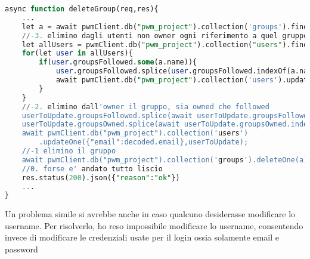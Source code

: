 \begin{lstlisting}[language=SQL]
async function deleteGroup(req,res){
    ...
    let a = await pwmClient.db("pwm_project").collection('groups').findOne({"name": validator.escape(req.params.name)})
    //-3. elimino dagli utenti non owner ogni riferimento a quel gruppo
    let allUsers = pwmClient.db("pwm_project").collection("users").find({"email":{$not: decoded.email}})
    for(let user in allUsers){
        if(user.groupsFollowed.some(a.name)){
            user.groupsFollowed.splice(user.groupsFollowed.indexOf(a.name),1)
            await pwmClient.db("pwm_project").collection('users').updateOne({"email":user.email},user)
        }
    }
    //-2. elimino dall'owner il gruppo, sia owned che followed
    userToUpdate.groupsFollowed.splice(await userToUpdate.groupsFollowed.indexOf(a.name),1)
    userToUpdate.groupsOwned.splice(await userToUpdate.groupsOwned.indexOf(a.name),1)
    await pwmClient.db("pwm_project").collection('users')
        .updateOne({"email":decoded.email},userToUpdate);
    //-1 elimino il gruppo
    await pwmClient.db("pwm_project").collection('groups').deleteOne(a)
    //0. forse e' andato tutto liscio
    res.status(200).json({"reason":"ok"})
    ...
}
\end{lstlisting}
\alert{Un problema simile si avrebbe anche in caso qualcuno desiderasse modificare lo username. Per risolverlo, ho reso impossibile modificare lo username, consentendo invece di modificare le credenziali usate per il login ossia solamente email e password}
\newpage